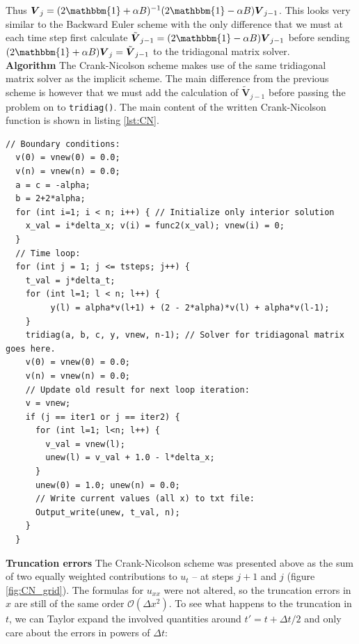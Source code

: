 \documentclass[a4paper, 11pt, notitlepage,english]{article}
\newcommand{\id}{\mathbbm{1}}
\begin{document}
Thus $\boldsymbol{V}_j = (2\id+\alpha B)^{-1}(2\id - \alpha B)\boldsymbol{V}_{j-1}$. This looks very similar to the Backward Euler scheme with the only difference that we must at each time step first calculate $\tilde{\boldsymbol{V}}_{j-1} = (2\id - \alpha B)\boldsymbol{V}_{j-1}$ before sending $(2\id + \alpha B)\boldsymbol{V}_j = \tilde{\boldsymbol{V}}_{j-1}$ to the tridiagonal matrix solver. \\

\textbf{Algorithm} \newline
The Crank-Nicolson scheme makes use of the same tridiagonal matrix solver as the implicit scheme. The main difference from the previous scheme is however that we must add the calculation of $\tilde{\mathbf{V}}_{j-1}$ before passing the problem on to \texttt{tridiag()}. The main content of the written Crank-Nicolson function is shown in listing \ref{lst:CN}. 

\begin{center}
\begin{lstlisting}
// Boundary conditions:
  v(0) = vnew(0) = 0.0;
  v(n) = vnew(n) = 0.0;
  a = c = -alpha; 
  b = 2+2*alpha; 
  for (int i=1; i < n; i++) { // Initialize only interior solution
    x_val = i*delta_x; v(i) = func2(x_val); vnew(i) = 0;
  }
  // Time loop: 
  for (int j = 1; j <= tsteps; j++) {
    t_val = j*delta_t;
    for (int l=1; l < n; l++) {
         y(l) = alpha*v(l+1) + (2 - 2*alpha)*v(l) + alpha*v(l-1);
    }
    tridiag(a, b, c, y, vnew, n-1); // Solver for tridiagonal matrix goes here.
    v(0) = vnew(0) = 0.0;
    v(n) = vnew(n) = 0.0;
    // Update old result for next loop iteration:
    v = vnew;
    if (j == iter1 or j == iter2) {
      for (int l=1; l<n; l++) {
        v_val = vnew(l);
        unew(l) = v_val + 1.0 - l*delta_x;
      }
      unew(0) = 1.0; unew(n) = 0.0;
      // Write current values (all x) to txt file:
      Output_write(unew, t_val, n);
    }
  }
\end{lstlisting}
\end{center}

\textbf{Truncation errors} \newline
The Crank-Nicolson scheme was presented above as the sum of two equally weighted contributions to $u_t$ – at steps $j+1$ and $j$ (figure \ref{fig:CN_grid}). The formulas for $u_{xx}$ were not altered, so the truncation errors in $x$ are still of the same order $\mathcal{O}(\Delta x^2)$. To see what happens to the truncation in $t$, we can Taylor expand the involved quantities around $t' = t + \Delta t /2$ and only care about the errors in powers of $\Delta t$:
\end{document}
